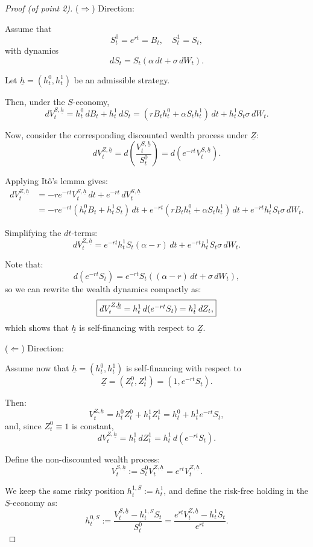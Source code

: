 \documentclass[12pt,a4paper]{article}
\theoremstyle{definition}
\begin{document}
\begin{proof}[Proof (of point 2)]
($\Rightarrow$) Direction:

Assume that
\[
S_t^0 = e^{rt} = B_t, \quad S_t^1 = S_t,
\]
with dynamics
\[
dS_t = S_t(\alpha \, dt + \sigma \, dW_t).
\]

Let $\underline{h} = (h_t^0, h_t^1)$ be an admissible strategy.

Then, under the $\underline{S}$-economy,
\[
dV_t^{S,\underline{h}} = h_t^0 \, dB_t + h_t^1 \, dS_t = (rB_t h_t^0 + \alpha S_t h_t^1) \, dt + h_t^1 S_t \sigma \, dW_t.
\]

Now, consider the corresponding discounted wealth process under $\underline{Z}$:
\[
dV_t^{Z,\underline{h}} = d\!\left(\frac{V_t^{S,\underline{h}}}{S_t^0}\right) = d(e^{-rt} V_t^{S,\underline{h}}).
\]

Applying Itô's lemma gives:
\[
\begin{aligned}
dV_t^{Z,\underline{h}} &= -r e^{-rt} V_t^{S,\underline{h}} \, dt + e^{-rt} \, dV_t^{S,\underline{h}} \\
&= -r e^{-rt} (h_t^0 B_t + h_t^1 S_t) \, dt + e^{-rt} (rB_t h_t^0 + \alpha S_t h_t^1) \, dt + e^{-rt} h_t^1 S_t \sigma \, dW_t.
\end{aligned}
\]

Simplifying the $dt$-terms:
\[
dV_t^{Z,\underline{h}} = e^{-rt} h_t^1 S_t (\alpha - r) \, dt + e^{-rt} h_t^1 S_t \sigma \, dW_t.
\]

Note that:
\[
d(e^{-rt} S_t) = e^{-rt} S_t ((\alpha - r) \, dt + \sigma \, dW_t),
\]
so we can rewrite the wealth dynamics compactly as:
\[
\fbox{$dV_t^{Z,\underline{h}} = h_t^1 \, d(e^{-rt} S_t) = h_t^1 \, dZ_t,$}
\]
which shows that $\underline{h}$ is self-financing with respect to $\underline{Z}$.

\vspace{1em}

($\Leftarrow$) Direction:

Assume now that $\underline{h} = (h_t^0, h_t^1)$ is self-financing with respect to
\[
\underline{Z} = (Z_t^0, Z_t^1) = (1, e^{-rt} S_t).
\]

Then:
\[
V_t^{Z,\underline{h}} = h_t^0 Z_t^0 + h_t^1 Z_t^1 = h_t^0 + h_t^1 e^{-rt} S_t,
\]
and, since $Z_t^0 \equiv 1$ is constant,
\[
dV_t^{Z,\underline{h}} = h_t^1 \, dZ_t^1 = h_t^1 \, d(e^{-rt} S_t).
\]

Define the non-discounted wealth process:
\[
V_t^{S,\underline{h}} := S_t^0 V_t^{Z,\underline{h}} = e^{rt} V_t^{Z,\underline{h}}.
\]

We keep the same risky position $h_t^{1,S} := h_t^1$,
and define the risk-free holding in the $\underline{S}$-economy as:
\[
h_t^{0,S} := \frac{V_t^{S,\underline{h}} - h_t^{1,S} S_t}{S_t^0} = \frac{e^{rt} V_t^{Z,\underline{h}} - h_t^1 S_t}{e^{rt}}.
\]


\end{proof}
\end{document}
